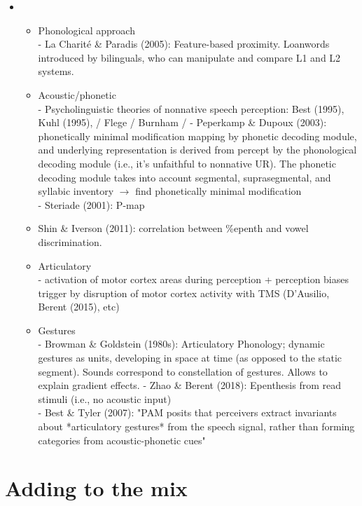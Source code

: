 \begin{itemize}
  \item
  \begin{itemize}
  \item Phonological approach \\
    - La Charité \& Paradis (2005): Feature-based proximity. Loanwords introduced by bilinguals, who can manipulate and compare L1 and L2 systems. \\
  \item Acoustic/phonetic \\
    - Psycholinguistic theories of nonnative speech perception: Best (1995), Kuhl (1995), / Flege / Burnham /  
    - Peperkamp \& Dupoux (2003): phonetically minimal modification mapping by phonetic decoding module, and underlying representation is derived from percept by the phonological decoding module (i.e., it's unfaithful to nonnative UR). The phonetic decoding module takes into account segmental, suprasegmental, and syllabic inventory $\rightarrow$ find phonetically minimal modification \\
    - Steriade (2001): P-map
  \item Shin \& Iverson (2011): correlation between \%epenth and vowel discrimination.   
  \item Articulatory \\
    - activation of motor cortex areas during perception + perception biases trigger by disruption of motor cortex activity with TMS (D'Ausilio, Berent (2015), etc)
  \item Gestures \\
    - Browman \& Goldstein (1980s): Articulatory Phonology; dynamic gestures as units, developing in space at time (as opposed to the static segment). Sounds correspond to constellation of gestures. Allows to explain gradient effects.  
    - Zhao \& Berent (2018): Epenthesis from read stimuli (i.e., no acoustic input) \\
    - Best \& Tyler (2007): "PAM posits that perceivers extract invariants about *articulatory gestures* from the speech signal, rather than forming categories from acoustic-phonetic cues"
  \end{itemize}
\end{itemize}

\section{Adding to the mix}  
 
